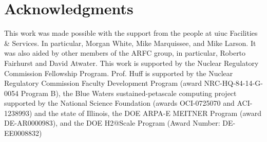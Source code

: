 \section{Acknowledgments}
This work was made possible with the support from the people at \gls{uiuc}
Facilities \& Services. In particular, Morgan White, Mike Marquissee, and Mike
Larson. It was also aided by other members of the \gls{ARFC} group, in
particular, Roberto Fairhurst and David Atwater.
This work is supported by the Nuclear Regulatory Commission Fellowship Program.
Prof. Huff is supported by the Nuclear Regulatory Commission Faculty
Development Program (award NRC-HQ-84-14-G-0054 Program B), the Blue Waters
sustained-petascale computing project supported by the National Science
Foundation (awards OCI-0725070 and ACI-1238993) and the state of Illinois, the
DOE ARPA-E MEITNER Program (award DE-AR0000983), and the DOE H2@Scale Program
(Award Number: DE-EE0008832)
